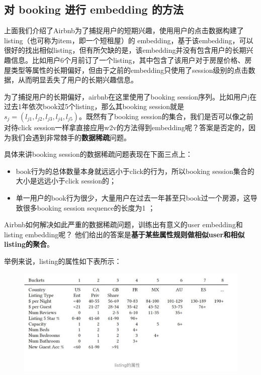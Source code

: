 \documentclass[12pt]{article}
\begin{document}
\subsection{对 booking 进行 embedding 的方法}
上面我们介绍了Airbnb为了捕捉用户的短期兴趣，使用用户的点击数据构建了listing（也可称为item，即一个短租屋）的 embedding，基于该embedding，可以很好的找出相似listing，但有所欠缺的是，该embedding并没有包含用户的长期兴趣信息。比如用户6个月前订了一个listing，其中包含了该用户对于房屋价格、房屋类型等属性的长期偏好，但由于之前的embedding只使用了session级别的点击数据，从而明显丢失了用户的长期兴趣信息。

为了捕捉用户的长期偏好，airbnb在这里使用了booking session序列。比如用户j在过去1年依次book过5个listing，那么其booking session就是$s_j = (l_{j1}, l_{j2}, l_{j3}, l_{j4}, l_{j5})$。既然有了booking session的集合，我们是否可以像之前对待click session一样拿直接应用w2v的方法得到embedding呢？答案是否定的，因为我们会遇到非常棘手的\textbf{数据稀疏}问题。

具体来讲booking session的数据稀疏问题表现在下面三点上：
\begin{itemize}
\setlength{\itemsep}{0pt}
\setlength{\parsep}{0pt}
\setlength{\parskip}{0pt}
    \item book行为的总体数量本身就远远小于click的行为，所以booking session集合的大小是远远小于click session的；
    \item 单一用户的book行为很少，大量用户在过去一年甚至只book过一个房源，这导致很多booking session sequence的长度为1
；
\end{itemize}

Airbnb如何解决如此严重的数据稀疏问题，训练出有意义的user embedding和listing embedding呢？
他们给出的答案是\textbf{基于某些属性规则做相似user和相似listing的聚合}。

举例来说，listing的属性如下表所示：
\begin{figure}[H]
    \centering
    \includegraphics[width=1\textwidth]{fig/Airbnb_Booking_Listing_Attrs.png}
\end{figure}
\end{document}
